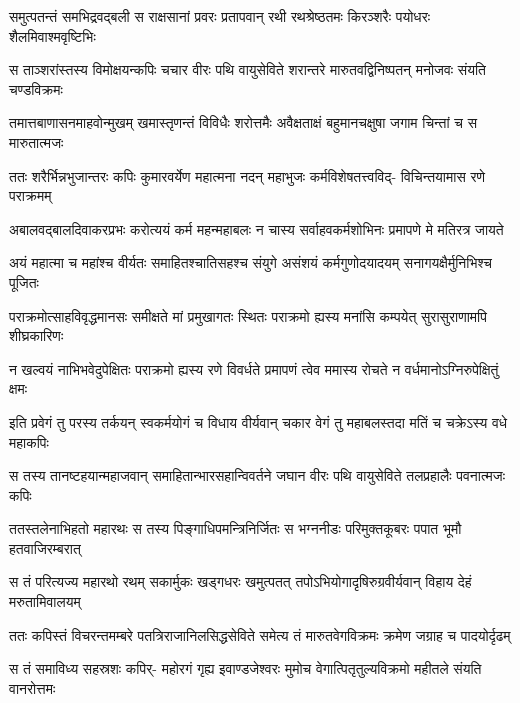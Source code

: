 \fourlineindentedshloka
{समुत्पतन्तं समभिद्रवद्बली}
{स राक्षसानां प्रवरः प्रतापवान्}
{रथी रथश्रेष्ठतमः किरञ्शरैः}
{पयोधरः शैलमिवाश्मवृष्टिभिः} %

\fourlineindentedshloka
{स ताञ्शरांस्तस्य विमोक्षयन्कपिः}
{चचार वीरः पथि वायुसेविते}
{शरान्तरे मारुतवद्विनिष्पतन्}
{मनोजवः संयति चण्डविक्रमः} %

\fourlineindentedshloka
{तमात्तबाणासनमाहवोन्मुखम्}
{खमास्तृणन्तं विविधैः शरोत्तमैः}
{अवैक्षताक्षं बहुमानचक्षुषा}
{जगाम चिन्तां च स मारुतात्मजः} %

\fourlineindentedshloka
{ततः शरैर्भिन्नभुजान्तरः कपिः}
{कुमारवर्येण महात्मना नदन्}
{महाभुजः कर्मविशेषतत्त्वविद्-}
{विचिन्तयामास रणे पराक्रमम्} %

\fourlineindentedshloka
{अबालवद्बालदिवाकरप्रभः}
{करोत्ययं कर्म महन्महाबलः}
{न चास्य सर्वाहवकर्मशोभिनः}
{प्रमापणे मे मतिरत्र जायते} %

\fourlineindentedshloka
{अयं महात्मा च महांश्च वीर्यतः}
{समाहितश्चातिसहश्च संयुगे}
{असंशयं कर्मगुणोदयादयम्}
{सनागयक्षैर्मुनिभिश्च पूजितः} %

\fourlineindentedshloka
{पराक्रमोत्साहविवृद्धमानसः}
{समीक्षते मां प्रमुखागतः स्थितः}
{पराक्रमो ह्यस्य मनांसि कम्पयेत्}
{सुरासुराणामपि शीघ्रकारिणः} %

\fourlineindentedshloka
{न खल्वयं नाभिभवेदुपेक्षितः}
{पराक्रमो ह्यस्य रणे विवर्धते}
{प्रमापणं त्वेव ममास्य रोचते}
{न वर्धमानोऽग्निरुपेक्षितुं क्षमः} %

\fourlineindentedshloka
{इति प्रवेगं तु परस्य तर्कयन्}
{स्वकर्मयोगं च विधाय वीर्यवान्}
{चकार वेगं तु महाबलस्तदा}
{मतिं च चक्रेऽस्य वधे महाकपिः} %

\fourlineindentedshloka
{स तस्य तानष्टहयान्महाजवान्}
{समाहितान्भारसहान्विवर्तने}
{जघान वीरः पथि वायुसेविते}
{तलप्रहालैः पवनात्मजः कपिः} %

\fourlineindentedshloka
{ततस्तलेनाभिहतो महारथः}
{स तस्य पिङ्गाधिपमन्त्रिनिर्जितः}
{स भग्ननीडः परिमुक्तकूबरः}
{पपात भूमौ हतवाजिरम्बरात्} %

\fourlineindentedshloka
{स तं परित्यज्य महारथो रथम्}
{सकार्मुकः खड्गधरः खमुत्पतत्}
{तपोऽभियोगादृषिरुग्रवीर्यवान्}
{विहाय देहं मरुतामिवालयम्} %

\fourlineindentedshloka
{ततः कपिस्तं विचरन्तमम्बरे}
{पतत्रिराजानिलसिद्धसेविते}
{समेत्य तं मारुतवेगविक्रमः}
{क्रमेण जग्राह च पादयोर्दृढम्} %

\fourlineindentedshloka
{स तं समाविध्य सहस्रशः कपिर्-}
{महोरगं गृह्य इवाण्डजेश्वरः}
{मुमोच वेगात्पितृतुल्यविक्रमो}
{महीतले संयति वानरोत्तमः} %


